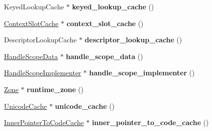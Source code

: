 \begin{DoxyCompactItemize}
\item 
\hypertarget{classv8_1_1internal_1_1_isolate_a6f1ad29ef38d3a0acca373294237d148}{}Keyed\+Lookup\+Cache $\ast$ {\bfseries keyed\+\_\+lookup\+\_\+cache} ()\label{classv8_1_1internal_1_1_isolate_a6f1ad29ef38d3a0acca373294237d148}

\item 
\hypertarget{classv8_1_1internal_1_1_isolate_a9b5e29875757a8dfa9d88ae120033a5b}{}\hyperlink{classv8_1_1internal_1_1_context_slot_cache}{Context\+Slot\+Cache} $\ast$ {\bfseries context\+\_\+slot\+\_\+cache} ()\label{classv8_1_1internal_1_1_isolate_a9b5e29875757a8dfa9d88ae120033a5b}

\item 
\hypertarget{classv8_1_1internal_1_1_isolate_a888616e5bc6b01b735b81db81b18f76e}{}Descriptor\+Lookup\+Cache $\ast$ {\bfseries descriptor\+\_\+lookup\+\_\+cache} ()\label{classv8_1_1internal_1_1_isolate_a888616e5bc6b01b735b81db81b18f76e}

\item 
\hypertarget{classv8_1_1internal_1_1_isolate_a89324c3550896825051b5db4ea1540b1}{}\hyperlink{structv8_1_1internal_1_1_handle_scope_data}{Handle\+Scope\+Data} $\ast$ {\bfseries handle\+\_\+scope\+\_\+data} ()\label{classv8_1_1internal_1_1_isolate_a89324c3550896825051b5db4ea1540b1}

\item 
\hypertarget{classv8_1_1internal_1_1_isolate_a324f1a0d4b1debe67ec40f05e0531cc0}{}\hyperlink{classv8_1_1internal_1_1_handle_scope_implementer}{Handle\+Scope\+Implementer} $\ast$ {\bfseries handle\+\_\+scope\+\_\+implementer} ()\label{classv8_1_1internal_1_1_isolate_a324f1a0d4b1debe67ec40f05e0531cc0}

\item 
\hypertarget{classv8_1_1internal_1_1_isolate_adb606ede4d19f0c7282d920907720dcc}{}\hyperlink{classv8_1_1internal_1_1_zone}{Zone} $\ast$ {\bfseries runtime\+\_\+zone} ()\label{classv8_1_1internal_1_1_isolate_adb606ede4d19f0c7282d920907720dcc}

\item 
\hypertarget{classv8_1_1internal_1_1_isolate_a804b7f6512081a2d8b761dea90320e53}{}\hyperlink{classv8_1_1internal_1_1_unicode_cache}{Unicode\+Cache} $\ast$ {\bfseries unicode\+\_\+cache} ()\label{classv8_1_1internal_1_1_isolate_a804b7f6512081a2d8b761dea90320e53}

\item 
\hypertarget{classv8_1_1internal_1_1_isolate_a99949749b070698fd4b2dab6a5bcf27d}{}\hyperlink{classv8_1_1internal_1_1_inner_pointer_to_code_cache}{Inner\+Pointer\+To\+Code\+Cache} $\ast$ {\bfseries inner\+\_\+pointer\+\_\+to\+\_\+code\+\_\+cache} ()\label{classv8_1_1internal_1_1_isolate_a99949749b070698fd4b2dab6a5bcf27d}


\end{DoxyCompactItemize}
